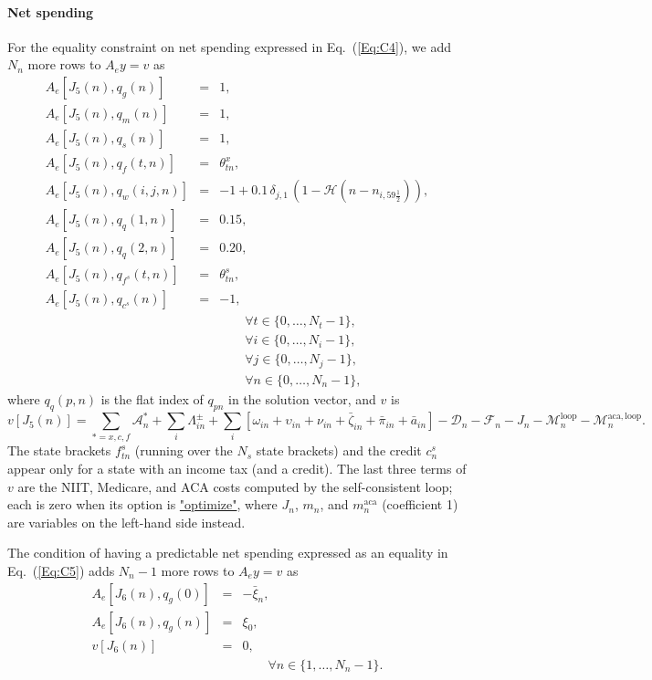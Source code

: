 \documentclass[fleqn,12pt]{report}
\newcommand{\code}[1]{\url{#1}}
\begin{document}
\paragraph*{Net spending}
For the equality constraint on net spending expressed in Eq.~(\ref{Eq:C4}),
we add $N_n$ more rows to $A_ey = v$ as
\begin{eqnarray}
	A_e[J_5(n), q_g(n)] &=& 1, \nonumber \\
	A_e[J_5(n), q_m(n)] &=& 1, \nonumber \\
	A_e[J_5(n), q_s(n)] &=& 1, \nonumber \\
	A_e[J_5(n), q_{f}(t, n)] &=& \theta^x_{tn}, \nonumber \\
	A_e[J_5(n), q_w(i, j, n)] &=& -1 + 0.1\,\delta_{j,1}\,(1-\mathcal{H}(n-n_{i,59\frac{1}{2}})), \nonumber \\
	A_e[J_5(n), q_q(1, n)] &=& 0.15, \nonumber \\
	A_e[J_5(n), q_q(2, n)] &=& 0.20, \nonumber \\
	A_e[J_5(n), q_{f^s}(t, n)] &=& \theta^s_{tn}, \nonumber \\
	A_e[J_5(n), q_{c^s}(n)] &=& -1, \nonumber \\
	&&\qquad\forall t \in \{0,\ldots, N_t-1\},\nonumber\\
	&&\qquad\forall i \in \{0,\ldots, N_i-1\},\nonumber\\
	&&\qquad\forall j \in \{0,\ldots, N_j-1\},\nonumber\\
	&&\qquad\forall n \in \{0,\ldots, N_n-1\}, \nonumber
\end{eqnarray}
where $q_q(p, n)$ is the flat index of $q_{pn}$ in the solution vector, and $v$ is
\begin{equation}
	v[J_5(n)] = \sum_{*=x,c,f} \mathcal{A}^*_n + \sum_i \Lambda^\pm_{in}
	+ \sum_i [\omega_{in} + \upsilon_{in} + \nu_{in} + \bar\zeta_{in} + \bar{\pi}_{in} + \bar{a}_{in}]
	- \mathcal{D}_n - \mathcal{F}_n - J_n - \mathcal{M}^{\mathrm{loop}}_n - \mathcal{M}^{\mathrm{aca,loop}}_n.
\end{equation}
The state brackets $f^s_{tn}$ (running over the $N_s$ state brackets) and the credit $c^s_n$
appear only for a state with an income tax (and a credit).
The last three terms of $v$ are the NIIT, Medicare, and ACA costs computed by the
self-consistent loop; each is zero when its option is \code{"optimize"}, where $J_n$, $m_n$, and
$m^{\mathrm{aca}}_n$ (coefficient 1) are variables on the left-hand side instead.

The condition of having a predictable net spending expressed as an
equality in Eq.~(\ref{Eq:C5}) adds $N_n-1$ more rows to $A_ey = v$ as
\begin{eqnarray}
	A_e[J_6(n), q_g(0)] &=& -\bar{\xi}_n, \nonumber \\
	A_e[J_6(n), q_g(n)] &=& \xi_0, \nonumber \\
	v[J_6(n)] &=& 0, \\
	&&\qquad\forall n \in \{1,\ldots, N_n-1\}. \nonumber
\end{eqnarray}
\end{document}
